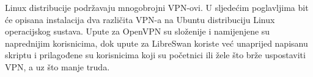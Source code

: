  Linux distribucije podržavaju mnogobrojni VPN-ovi. U sljedećim poglavljima bit će opisana instalacija dva različita VPN-a na Ubuntu distribuciju Linux operacijskog sustava. Upute za OpenVPN su složenije i namijenjene su naprednijim korisnicima, dok upute za LibreSwan koriste već unaprijed napisanu skriptu i prilagođene su korisnicima koji su početnici ili žele što brže uspostaviti VPN, a uz što manje truda.